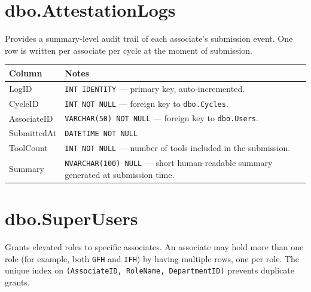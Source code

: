 \documentclass[12pt,a4paper]{report}
\begin{document}
\section{dbo.AttestationLogs}

Provides a summary-level audit trail of each associate's submission event. One row is written
per associate per cycle at the moment of submission.

\begin{longtable}{>{\ttfamily}p{4.5cm} >{\raggedright\arraybackslash}p{9.5cm}}
\toprule
\normalfont\textbf{Column} & \textbf{Notes} \\
\midrule
\endhead
LogID       & \texttt{INT IDENTITY} — primary key, auto-incremented. \\
CycleID     & \texttt{INT NOT NULL} — foreign key to \texttt{dbo.Cycles}. \\
AssociateID & \texttt{VARCHAR(50) NOT NULL} — foreign key to \texttt{dbo.Users}. \\
SubmittedAt & \texttt{DATETIME NOT NULL} \\
ToolCount   & \texttt{INT NOT NULL} — number of tools included in the submission. \\
Summary     & \texttt{NVARCHAR(100) NULL} — short human-readable summary generated at
              submission time. \\
\bottomrule
\end{longtable}

\section{dbo.SuperUsers}

Grants elevated roles to specific associates. An associate may hold more than one role (for
example, both \texttt{GFH} and \texttt{IFH}) by having multiple rows, one per role. The unique
index on \texttt{(AssociateID, RoleName, DepartmentID)} prevents duplicate grants.
\end{document}
